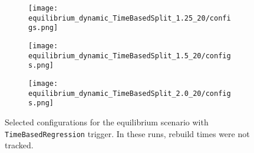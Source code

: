 \documentclass[]{article}
\begin{document}
\begin{figure}[H]
	\begin{center}
		\begin{subfigure}[b]{0.3\textwidth}
			\texttt{[image: equilibrium\_dynamic\_TimeBasedSplit\_1.25\_20/configs.png]}
		\end{subfigure}
		\begin{subfigure}[b]{0.3\textwidth}
			\texttt{[image: equilibrium\_dynamic\_TimeBasedSplit\_1.5\_20/configs.png]}
		\end{subfigure}
		\begin{subfigure}[b]{0.3\textwidth}
			\texttt{[image: equilibrium\_dynamic\_TimeBasedSplit\_2.0\_20/configs.png]}
		\end{subfigure}
	\end{center}
	\caption[]{Selected configurations for the equilibrium scenario with \texttt{TimeBasedRegression} trigger. In these runs, rebuild times were not tracked.}
	\label{fig_equil_configs_dyn_reg_no_rebuild}
\end{figure}
\end{document}
